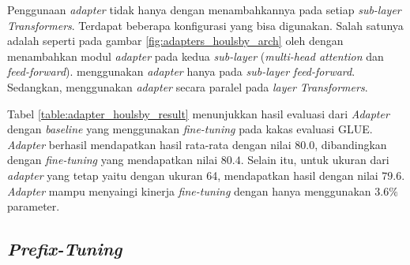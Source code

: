 Penggunaan \textit{adapter} tidak hanya dengan menambahkannya pada setiap \textit{sub-layer Transformers}. Terdapat beberapa konfigurasi yang bisa digunakan. Salah satunya adalah seperti pada gambar \ref{fig:adapters_houlsby_arch} oleh \parencite{adapter_houlsby} dengan menambahkan modul \textit{adapter} pada kedua \textit{sub-layer} (\textit{multi-head attention} dan \textit{feed-forward}). \citeauthor{adapter_pfeiffer} menggunakan \textit{adapter} hanya pada \textit{sub-layer feed-forward}. Sedangkan, \citeauthor{uvpl} menggunakan \textit{adapter} secara paralel pada \textit{layer Transformers}.

\begin{table}[h]
    \vspace{0.25cm}
    \centering
    \caption{Hasil evaluasi \textit{Adapter} konfigurasi \citeauthor{adapter_houlsby} pada GLUE \parencite{adapter_houlsby}}
    \label{table:adapter_houlsby_result}
\end{table}

Tabel \ref{table:adapter_houlsby_result} menunjukkan hasil evaluasi dari \textit{Adapter} dengan \textit{baseline} yang menggunakan \textit{fine-tuning} pada kakas evaluasi GLUE. \textit{Adapter} berhasil mendapatkan hasil rata-rata dengan nilai $80.0$, dibandingkan dengan \textit{fine-tuning} yang mendapatkan nilai $80.4$. Selain itu, untuk ukuran dari \textit{adapter} yang tetap yaitu dengan ukuran 64, mendapatkan hasil dengan nilai $79.6$. \textit{Adapter} mampu menyaingi kinerja \textit{fine-tuning} dengan hanya menggunakan $3.6\%$ parameter.

\subsection{\textit{Prefix-Tuning}}
\label{sec:prefix-tuning}

